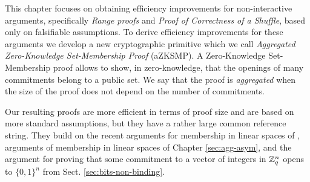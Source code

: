 This chapter focuses on obtaining efficiency improvements for non-interactive arguments, specifically \emph{Range proofs} and \emph{Proof of Correctness of a Shuffle}, based only on falsifiable assumptions.  To derive efficiency improvements for these arguments we develop a new cryptographic primitive which we call \emph{Aggregated Zero-Knowledge Set-Membership Proof} (aZKSMP). A Zero-Knowledge Set-Membership proof allows to show, in zero-knowledge, that the openings of many commitments belong to a public set. We say that the proof is \emph{aggregated} when the size of the proof does not depend on the number of commitments.

Our resulting proofs are more efficient in terms of proof size and are based on more standard assumptions, but they have a rather large common reference string. They build on the recent arguments for membership in linear spaces of \cite{EC:LPJY14,C:JutRoy14,EC:KilWee15}, arguments of membership in linear spaces of Chapter \ref{sec:agg-asym}, and the argument for proving that some commitment to a vector of integers in $\mathbb{Z}_q^{n}$ opens to $\{0,1\}^n$ from Sect. \ref{sec:bits-non-binding}.
 
